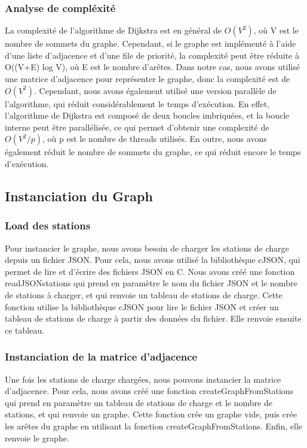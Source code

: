 \documentclass[french,a4paper]{article}
\begin{document}
\subsubsection{Analyse de compléxité}

La complexité de l'algorithme de Dijkstra est en général de $O(V^2)$, où V est le nombre de sommets du graphe. Cependant, si le graphe est implémenté à l'aide d'une liste d'adjacence et d'une file de priorité, la complexité peut être réduite à O((V+E) log V), où E est le nombre d'arêtes. Dans notre cas, nous avons utilisé une matrice d'adjacence pour représenter le graphe, donc la complexité est de $O(V^2)$. Cependant, nous avons également utilisé une version parallèle de l'algorithme, qui réduit considérablement le temps d'exécution. En effet, l'algorithme de Dijkstra est composé de deux boucles imbriquées, et la boucle interne peut être parallélisée, ce qui permet d'obtenir une complexité de $O(V^2/p)$, où p est le nombre de threads utilisés. En outre, nous avons également réduit le nombre de sommets du graphe, ce qui réduit encore le temps d'exécution.

\subsection{Instanciation du Graph}

\subsubsection{Load des stations}
Pour instancier le graphe, nous avons besoin de charger les stations de charge depuis un fichier JSON. Pour cela, nous avons utilisé la bibliothèque cJSON, qui permet de lire et d'écrire des fichiers JSON en C. Nous avons créé une fonction readJSONstations qui prend en paramètre le nom du fichier JSON et le nombre de stations à charger, et qui renvoie un tableau de stations de charge. Cette fonction utilise la bibliothèque cJSON pour lire le fichier JSON et créer un tableau de stations de charge à partir des données du fichier. Elle renvoie ensuite ce tableau.

\subsubsection{Instanciation de la matrice d'adjacence}
Une fois les stations de charge chargées, nous pouvons instancier la matrice d'adjacence. Pour cela, nous avons créé une fonction createGraphFromStations qui prend en paramètre un tableau de stations de charge et le nombre de stations, et qui renvoie un graphe. Cette fonction crée un graphe vide, puis crée les arêtes du graphe en utilisant la fonction createGraphFromStations. Enfin, elle renvoie le graphe.
\end{document}
